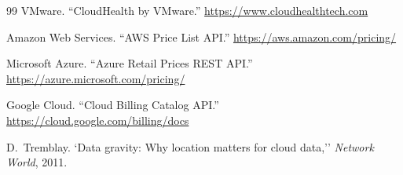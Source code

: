 \documentclass[10pt,journal]{IEEEtran}
\begin{document}
\begin{thebibliography}{99}
VMware. ``CloudHealth by VMware.''
\url{https://www.cloudhealthtech.com}

Amazon Web Services. ``AWS Price List API.''
\url{https://aws.amazon.com/pricing/}

Microsoft Azure. ``Azure Retail Prices REST API.''
\url{https://azure.microsoft.com/pricing/}

Google Cloud. ``Cloud Billing Catalog API.''
\url{https://cloud.google.com/billing/docs}


D.~Tremblay. `Data gravity: Why location matters for cloud data,''
\textit{Network World}, 2011.

\end{thebibliography}
\end{document}

